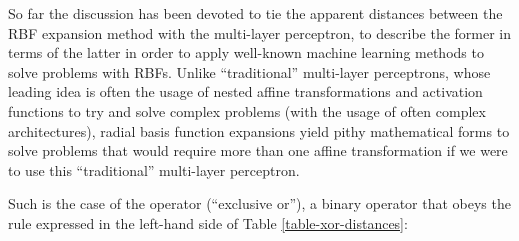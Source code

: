 \documentclass[12pt]{report} %
\newcommand{\tmverbatim}[1]{\text{{\ttfamily{#1}}}}
\begin{document}
So far the discussion has been devoted to tie the apparent distances between
the RBF expansion method with the multi-layer perceptron, to describe the
former in terms of the latter in order to apply well-known machine learning
methods to solve problems with RBFs. Unlike ``traditional'' multi-layer
perceptrons, whose leading idea is often the usage of nested affine
transformations and activation functions to try and solve complex problems
(with the usage of often complex architectures), radial basis function
expansions yield pithy mathematical forms to solve problems that would require
more than one affine transformation if we were to use this ``traditional''
multi-layer perceptron.

Such is the case of the \tmverbatim{xor} operator (``exclusive or''), a
binary operator that obeys the rule expressed in the left-hand side of Table
\ref{table-xor-distances}:

\end{document}
